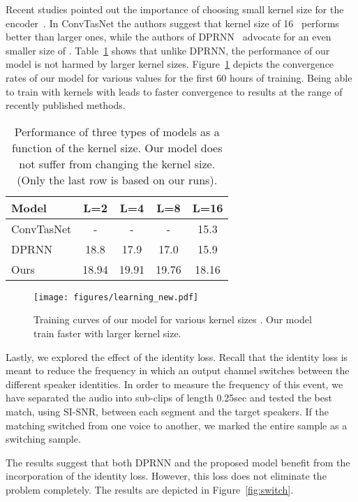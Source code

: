 \documentclass{article}
\begin{document}
Recent studies pointed out the importance of choosing small kernel size for the encoder~\cite{luo2019dual}. In ConvTasNet the authors suggest that kernel size  of 16~\cite{luo2019conv} performs better than larger ones, while the authors of DPRNN~\cite{luo2019dual} advocate for an even smaller size of . Table~\ref{tab:funcofL} shows that unlike DPRNN, the performance of our model is not harmed by larger kernel sizes. Figure~\ref{fig:convergence} depicts the convergence rates of our model for various  values for the first 60 hours of training. Being able to train with kernels with  {\color{black}leads to faster convergence to results at the range of recently published methods}.

\begin{table}[t]
    \centering
    \caption{Performance of three types of models as a function of the kernel size. Our model does not suffer from changing the kernel size. (Only the last row is based on our runs).}
    \label{tab:funcofL}
    \begin{tabular}{lcccc}
    \toprule
Model&	L=2&	L=4&	L=8&	L=16\\
\midrule
ConvTasNet&	-&	-	&-	&15.3\\
DPRNN&	18.8&	17.9&	17.0&	15.9\\
Ours&	18.94&	19.91&	19.76&	18.16\\
\bottomrule
\end{tabular}
\end{table}

\begin{figure}[t]
   \centering
       \texttt{[image: figures/learning\_new.pdf]}
    \caption{Training curves of our model for various kernel sizes . Our model train faster with larger kernel size.}
 \label{fig:convergence}
\end{figure}

Lastly, we explored the effect of the identity loss. Recall that the identity loss is meant to reduce the frequency in which an output channel switches between the different speaker identities. In order to measure the frequency of this event, we have separated the audio into sub-clips of length 0.25sec and tested the best match, using SI-SNR, between each segment and the target speakers. If the matching switched from one voice to another, we marked the entire sample as a switching sample. 

The results suggest that both DPRNN and the proposed model benefit from the incorporation of the identity loss. However, this loss does not eliminate the problem completely. The results are depicted in Figure~\ref{fig:switch}. 
\end{document}
